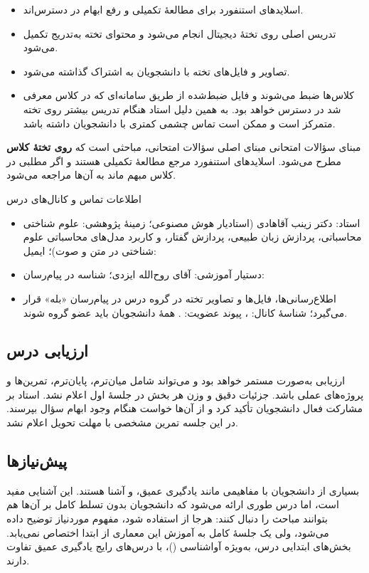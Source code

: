 \begin{itemize}
  \item اسلایدهای استنفورد برای مطالعهٔ تکمیلی و رفع ابهام در دسترس‌اند.
  \item تدریس اصلی روی تختهٔ دیجیتال  انجام می‌شود و محتوای تخته به‌تدریج تکمیل می‌شود.
  \item تصاویر و فایل‌های تخته با دانشجویان به اشتراک گذاشته می‌شود.
  \item کلاس‌ها ضبط می‌شوند و فایل ضبط‌شده از طریق سامانه‌ای که در کلاس معرفی شد در دسترس خواهد بود. به همین دلیل استاد هنگام تدریس بیشتر روی تخته متمرکز است و ممکن است تماس چشمی کمتری با دانشجویان داشته باشد.
\end{itemize}

\begin{exambox}{مبنای سؤالات امتحانی}
مبنای اصلی سؤالات امتحانی، مباحثی است که \textbf{روی تختهٔ کلاس} مطرح می‌شود. اسلایدهای استنفورد مرجع مطالعهٔ تکمیلی هستند و اگر مطلبی در کلاس مبهم ماند به آن‌ها مراجعه می‌شود.
\end{exambox}

\begin{exambox}{اطلاعات تماس و کانال‌های درس}
\begin{itemize}
  \item استاد: دکتر زینب آقاهادی (استادیار هوش مصنوعی؛ زمینهٔ پژوهشی: علوم شناختی محاسباتی، پردازش زبان طبیعی، پردازش گفتار، و کاربرد مدل‌های محاسباتی علوم شناختی در متن و صوت)؛ ایمیل: 
  \item دستیار آموزشی: آقای روح‌الله ایزدی؛ شناسه در پیام‌رسان: 
  \item اطلاع‌رسانی‌ها، فایل‌ها و تصاویر تخته در گروه درس در پیام‌رسان «بله» قرار می‌گیرد؛ شناسهٔ کانال: ، پیوند عضویت: . همهٔ دانشجویان باید عضو گروه شوند.
\end{itemize}
\end{exambox}

\subsection{ارزیابی درس}
ارزیابی به‌صورت مستمر خواهد بود و می‌تواند شامل میان‌ترم، پایان‌ترم، تمرین‌ها و پروژه‌های عملی باشد. جزئیات دقیق و وزن هر بخش در جلسهٔ اول اعلام نشد. استاد بر مشارکت فعال دانشجویان تأکید کرد و از آن‌ها خواست هنگام وجود ابهام سؤال بپرسند. در این جلسه تمرین مشخصی با مهلت تحویل اعلام نشد.

\subsection{پیش‌نیازها}
بسیاری از دانشجویان با مفاهیمی مانند یادگیری عمیق،  و  آشنا هستند. این آشنایی مفید است، اما درس طوری ارائه می‌شود که دانشجویان بدون تسلط کامل بر آن‌ها هم بتوانند مباحث را دنبال کنند: هرجا از  استفاده شود، مفهوم موردنیاز توضیح داده می‌شود، ولی یک جلسهٔ کامل به آموزش این معماری از ابتدا اختصاص نمی‌یابد. بخش‌های ابتدایی درس، به‌ویژه آواشناسی ()، با درس‌های رایج یادگیری عمیق تفاوت دارند.

